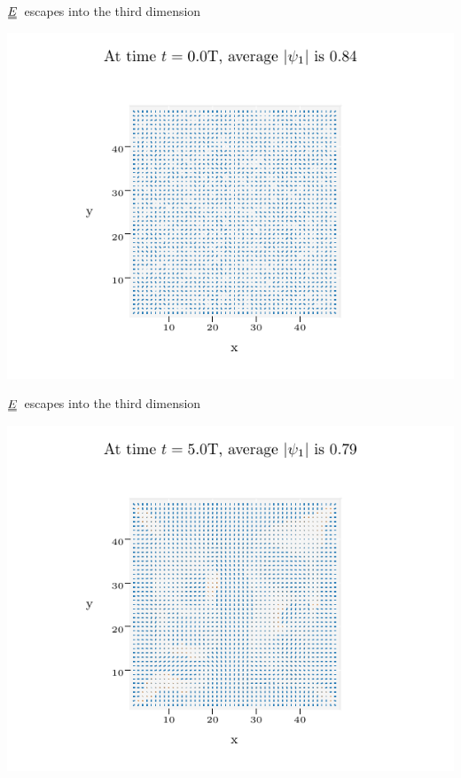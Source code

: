 \documentclass[10pt,mathserif]{beamer}
\newcommand{\duf}[2]{\stackunder[0.5pt]{\stackunder[0.8pt]{\stackunder[1pt]{\ensuremath{#1}}{\rule{\widthof{\ensuremath{#2}}*\real{0.9}}{.1ex}}}{\rule{\widthof{\ensuremath{#2}}*\real{0.9}}{.1ex}}}{}}
\newcommand{\du}[1]{\duf{#1}{#1}}
\newcommand{\EE}{\ensuremath{\du{E}}}
\begin{document}
\begin{frame}[fragile]{\EE\ escapes into the third dimension}
    \newrefsection
    \begin{center}
        \includegraphics{figures/data_plots/walls_seed_0.pdf}
    \end{center}
\end{frame}

\begin{frame}[fragile]{\EE\ escapes into the third dimension}
    \newrefsection
    \begin{center}
        \includegraphics{figures/data_plots/walls_seed_1.pdf}
    \end{center}
\end{frame}
\end{document}
